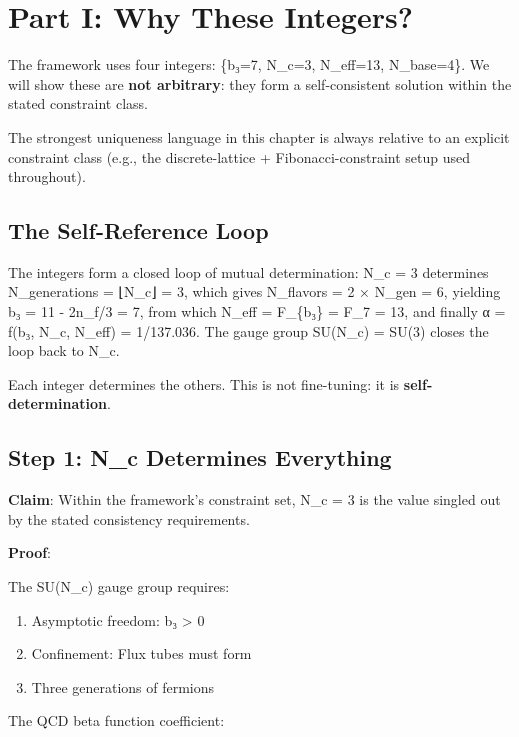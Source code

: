 \documentclass[
  11pt,
  letterpaper,
  twoside,
  openright]{book}
\providecommand{\tightlist}{%
  \setlength{\itemsep}{0pt}\setlength{\parskip}{0pt}}
\begin{document}
\section{Part I: Why These Integers?}\label{part-i-why-these-integers}

The framework uses four integers: \{b₃=7, N\_c=3, N\_eff=13,
N\_base=4\}. We will show these are \textbf{not arbitrary}: they form a
self-consistent solution within the stated constraint class.

The strongest uniqueness language in this chapter is always relative to
an explicit constraint class (e.g., the discrete-lattice +
Fibonacci-constraint setup used throughout).

\subsection{The Self-Reference Loop}\label{the-self-reference-loop}

The integers form a closed loop of mutual determination: N\_c = 3
determines N\_generations = ⌊N\_c⌋ = 3, which gives N\_flavors = 2 ×
N\_gen = 6, yielding b₃ = 11 - 2n\_f/3 = 7, from which N\_eff =
F\_\{b₃\} = F\_7 = 13, and finally α = f(b₃, N\_c, N\_eff) = 1/137.036.
The gauge group SU(N\_c) = SU(3) closes the loop back to N\_c.

Each integer determines the others. This is not fine-tuning: it is
\textbf{self-determination}.

\subsection{Step 1: N\_c Determines
Everything}\label{step-1-n_c-determines-everything}

\textbf{Claim}: Within the framework's constraint set, N\_c = 3 is the
value singled out by the stated consistency requirements.

\textbf{Proof}:

The SU(N\_c) gauge group requires:

\begin{enumerate}
\def\labelenumi{\arabic{enumi}.}
\tightlist
\item
  Asymptotic freedom: b₃ \textgreater{} 0
\item
  Confinement: Flux tubes must form
\item
  Three generations of fermions
\end{enumerate}

The QCD beta function coefficient:
\end{document}
